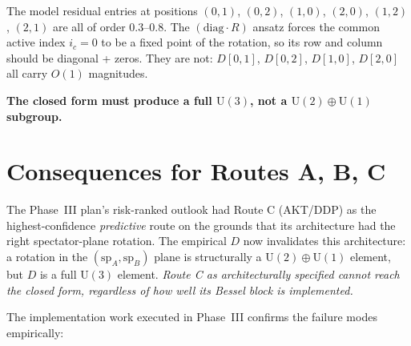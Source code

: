 \documentclass[11pt]{article}
\begin{document}
The model residual entries at positions $(0,1)$, $(0,2)$, $(1,0)$,
$(2,0)$, $(1,2)$, $(2,1)$ are all of order $0.3$--$0.8$. The
$(\mathrm{diag}\cdot R)$ ansatz forces the common active index
$i_c = 0$ to be a fixed point of the rotation, so its row and column
should be diagonal + zeros. They are not: $D[0,1]$, $D[0,2]$,
$D[1,0]$, $D[2,0]$ all carry $O(1)$ magnitudes.

\textbf{The closed form must produce a full $\mathrm U(3)$, not a
$\mathrm U(2)\oplus\mathrm U(1)$ subgroup.}

\section{Consequences for Routes A, B, C}

The Phase~III plan's risk-ranked outlook had Route C (AKT/DDP) as the
highest-confidence \emph{predictive} route on the grounds that its
architecture had the right spectator-plane rotation. The empirical
$D$ now invalidates this architecture: a rotation in the
$(\mathrm{sp}_A, \mathrm{sp}_B)$ plane is structurally a
$\mathrm U(2)\oplus\mathrm U(1)$ element, but $D$ is a full
$\mathrm U(3)$ element. \emph{Route C as architecturally
specified cannot reach the closed form, regardless of how well its
Bessel block is implemented.}

The implementation work executed in Phase~III confirms the failure
modes empirically:
\end{document}
